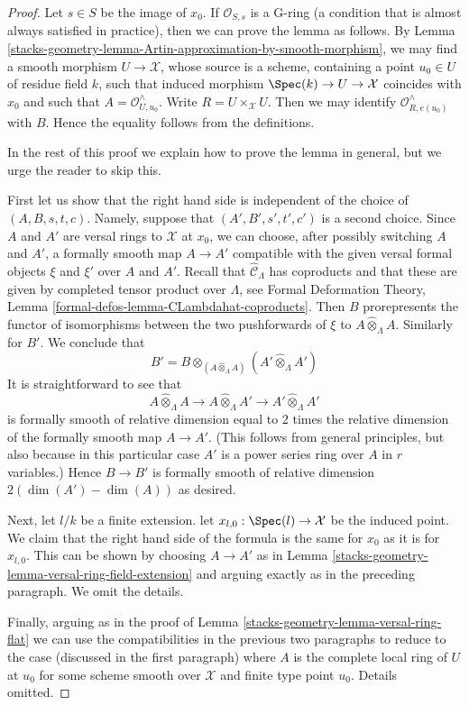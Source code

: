 \begin{proof}
Let $s \in S$ be the image of $x_0$. If $\mathcal{O}_{S, s}$
is a G-ring (a condition that is almost always satisfied in practice),
then we can prove the lemma as follows.
By Lemma \ref{stacks-geometry-lemma-Artin-approximation-by-smooth-morphism},
we may find a smooth morphism $U \to \mathcal{X}$, whose source is a scheme,
containing a point $u_0 \in U$ of residue field $k$, such that induced
morphism $\Spec(k) \to U \to \mathcal{X}$ coincides with $x_0$
and such that $A = \mathcal{O}_{U, u_0}^\wedge$.
Write $R = U \times_\mathcal{X} U$. Then we may identify
$\mathcal{O}_{R, e(u_0)}^\wedge$ with $B$.
Hence the equality follows from the definitions.

\medskip\noindent
In the rest of this proof we explain how to prove the lemma in
general, but we urge the reader to skip this.

\medskip\noindent
First let us show that the right hand side is independent of the choice
of $(A, B, s, t, c)$. Namely, suppose that $(A', B', s', t', c')$
is a second choice. Since $A$ and $A'$ are versal rings to $\mathcal{X}$
at $x_0$, we can choose, after possibly switching $A$ and $A'$,
a formally smooth map $A \to A'$ compatible with the given versal
formal objects $\xi$ and $\xi'$ over $A$ and $A'$.
Recall that $\widehat{\mathcal{C}}_\Lambda$ has
coproducts and that these are given by completed tensor product
over $\Lambda$, see Formal Deformation Theory, Lemma
\ref{formal-defos-lemma-CLambdahat-coproducts}.
Then $B$ prorepresents the functor of isomorphisms between the
two pushforwards of $\xi$ to $A \widehat{\otimes}_\Lambda A$.
Similarly for $B'$. We conclude that
$$
B' =
B \otimes_{(A \widehat{\otimes}_\Lambda A)}
(A' \widehat{\otimes}_\Lambda A')
$$
It is straightforward to see that
$$
A \widehat{\otimes}_\Lambda A \longrightarrow
A \widehat{\otimes}_\Lambda A' \longrightarrow
A' \widehat{\otimes}_\Lambda A'
$$
is formally smooth of relative dimension equal to $2$ times the
relative dimension of the formally smooth map $A \to A'$.
(This follows from general principles, but also because
in this particular case $A'$ is a power series ring over $A$
in $r$ variables.) Hence $B \to B'$ is formally smooth of
relative dimension $2(\dim(A') - \dim(A))$ as desired.

\medskip\noindent
Next, let $l/k$ be a finite extension. let
$x_{l, 0} : \Spec(l) \to \mathcal{X}$ be
the induced point. We claim that the right hand side of the formula
is the same for $x_0$ as it is for $x_{l, 0}$.
This can be shown by choosing $A \to A'$ as in
Lemma \ref{stacks-geometry-lemma-versal-ring-field-extension}
and arguing exactly as in the preceding paragraph.
We omit the details.

\medskip\noindent
Finally, arguing as in the proof of Lemma \ref{stacks-geometry-lemma-versal-ring-flat}
we can use the compatibilities in the previous two paragraphs
to reduce to the case (discussed in the first paragraph)
where $A$ is the complete local ring of $U$ at $u_0$ for some
scheme smooth over $\mathcal{X}$ and finite type point $u_0$.
Details omitted.
\end{proof}



